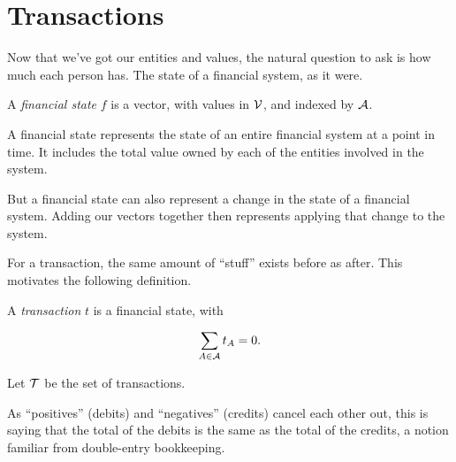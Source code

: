 \section{Transactions}

Now that we've got our entities and values, the natural question to ask is how much each person has.
The state of a financial system, as it were.

\begin{definition}
    A \emph{financial state} $f$ is a vector, with values in $\mathcal{V}$, and indexed by $\mathcal{A}$.
\end{definition}

A financial state represents the state of an entire financial system at a point in time.
It includes the total value owned by each of the entities involved in the system.

But a financial state can also represent a change in the state of a financial system.
Adding our vectors together then represents applying that change to the system.

For a transaction, the same amount of ``stuff'' exists before as after.
This motivates the following definition.

\begin{definition}
    A \emph{transaction} $t$ is a financial state, with

    \begin{equation*}
        \sum_{A \in \mathcal{A}} t_A = 0.
    \end{equation*}

    Let $\mathcal{T}$ be the set of transactions.
\end{definition}

As ``positives'' (debits) and ``negatives'' (credits) cancel each other out,
this is saying that the total of the debits is the same as the total of the credits,
a notion familiar from double-entry bookkeeping.

